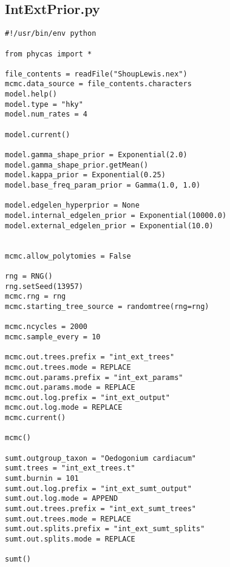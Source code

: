 \documentclass{article}
\begin{document}
\subsection{IntExtPrior.py}\label{IntExtPrior}
\begin{verbatim}
#!/usr/bin/env python

from phycas import *

file_contents = readFile("ShoupLewis.nex")
mcmc.data_source = file_contents.characters
model.help()
model.type = "hky"
model.num_rates = 4

model.current()

model.gamma_shape_prior = Exponential(2.0)
model.gamma_shape_prior.getMean()
model.kappa_prior = Exponential(0.25)
model.base_freq_param_prior = Gamma(1.0, 1.0)

model.edgelen_hyperprior = None
model.internal_edgelen_prior = Exponential(10000.0)
model.external_edgelen_prior = Exponential(10.0)


mcmc.allow_polytomies = False

rng = RNG()
rng.setSeed(13957)
mcmc.rng = rng
mcmc.starting_tree_source = randomtree(rng=rng)

mcmc.ncycles = 2000
mcmc.sample_every = 10

mcmc.out.trees.prefix = "int_ext_trees" 
mcmc.out.trees.mode = REPLACE 
mcmc.out.params.prefix = "int_ext_params" 
mcmc.out.params.mode = REPLACE 
mcmc.out.log.prefix = "int_ext_output" 
mcmc.out.log.mode = REPLACE 
mcmc.current()

mcmc()

sumt.outgroup_taxon = "Oedogonium cardiacum" 
sumt.trees = "int_ext_trees.t" 
sumt.burnin = 101 
sumt.out.log.prefix = "int_ext_sumt_output" 
sumt.out.log.mode = APPEND 
sumt.out.trees.prefix = "int_ext_sumt_trees" 
sumt.out.trees.mode = REPLACE 
sumt.out.splits.prefix = "int_ext_sumt_splits" 
sumt.out.splits.mode = REPLACE 

sumt()


\end{verbatim}


\newpage

\end{document}
